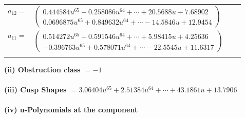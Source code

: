 \documentclass[1p]{elsarticle_modified}
\theoremstyle{definition}
\begin{document}
\begin{tabular}{m{7pt} m{180pt} m{7pt} m{180pt} }
\flushright $a_{12}=$&$\begin{pmatrix}0.444584 u^{65}-0.258086 u^{64}+\cdots+20.5688 u-7.68902\\0.0696875 u^{65}+0.849632 u^{64}+\cdots-14.5846 u+12.9454\end{pmatrix}$ \\
\flushright $a_{11}=$&$\begin{pmatrix}0.514272 u^{65}+0.591546 u^{64}+\cdots+5.98415 u+4.25636\\-0.396763 u^{65}+0.578071 u^{64}+\cdots-22.5545 u+11.6317\end{pmatrix}$\\&\end{tabular}
\flushleft \textbf{(ii) Obstruction class $= -1$}\\~\\
\flushleft \textbf{(iii) Cusp Shapes $= 3.06404 u^{65}+2.51384 u^{64}+\cdots+43.1861 u+13.7906$}\\~\\
\newpage\renewcommand{\arraystretch}{1}
\flushleft \textbf{(iv) u-Polynomials at the component}\newline \\
\end{document}
